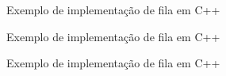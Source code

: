 \begin{frame}[fragile]{Exemplo de implementação de fila em C++}
\end{frame}

\begin{frame}[fragile]{Exemplo de implementação de fila em C++}
\end{frame}

\begin{frame}[fragile]{Exemplo de implementação de fila em C++}
\end{frame}

